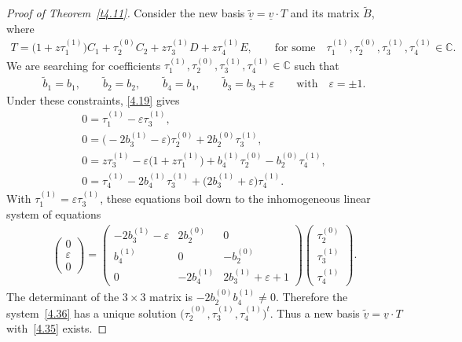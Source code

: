 \documentclass[10pt,a4paper]{amsart}
\numberwithin{equation}{section}
\numberwithin{figure}{section}
\newcommand{\C}{{\mathbb C}}
\newcommand{\www}{\widetilde}
\newcommand{\uuuu}{\underline}
\begin{document}
\begin{proof}[Proof of Theorem~\ref{t4.11}]
Consider the new basis $\uuuu{\www v}=\uuuu{v}\cdot T$
and its matrix $\www B$, where
\begin{gather*}%
T=\big(1+z\tau_1^{(1)}\big)C_1+\tau_2^{(0)}C_2+z\tau_3^{(1)}D
+z\tau_4^{(1)}E,\qquad \text{for some}\quad
\tau_1^{(1)},\tau_2^{(0)},
\tau_3^{(1)},\tau_4^{(1)}\in\C.%
\end{gather*}
We are searching for coefficients
$\tau_1^{(1)},\tau_2^{(0)},\tau_3^{(1)},\tau_4^{(1)}\in\C$
such that
\begin{gather}\label{4.35}
\www b_1=b_1,\qquad
\www b_2=b_2,\qquad
\www b_4=b_4,\qquad
\www b_3=b_3+\varepsilon\qquad \text{with}\quad \varepsilon=\pm 1.
\end{gather}
Under these constraints,
\eqref{4.19} gives
\begin{gather*}
0= \tau_1^{(1)}-\varepsilon \tau_3^{(1)},
\\
0= \big({-}2b_3^{(1)}-\varepsilon\big)\tau_2^{(0)}+ 2b_2^{(0)}\tau_3^{(1)},
\\
0= z\tau_3^{(1)}-\varepsilon\big(1+z\tau_1^{(1)}\big)+b_4^{(1)}\tau_2^{(0)} -b_2^{(0)}\tau_4^{(1)},
\\
0=\tau_4^{(1)} -2b_4^{(1)}\tau_3^{(1)}+\big(2b_3^{(1)}+\varepsilon\big)\tau_4^{(1)}.
\end{gather*}
With $\tau_1^{(1)}=\varepsilon\tau_3^{(1)}$, these
equations boil down to the inhomogeneous linear system
of equations
\begin{gather}\label{4.36}
\begin{pmatrix}0\\ \varepsilon\\ 0 \end{pmatrix} =
\begin{pmatrix} -2b_3^{(1)}-\varepsilon & 2b_2^{(0)} & 0 \\
b_4^{(1)} & 0 & -b_2^{(0)} \\
0 & -2b_4^{(1)} & 2b_3^{(1)}+\varepsilon+1 \end{pmatrix}
\begin{pmatrix} \tau_2^{(0)}\\ \tau_3^{(1)}\\ \tau_4^{(1)}
\end{pmatrix}\!.
\end{gather}
The determinant of the $3\times 3$ matrix is
$-2 b_2^{(0)}b_4^{(1)}\neq 0$. Therefore the system~\eqref{4.36}
has a unique solution $\big(\tau_2^{(0)},\tau_3^{(1)},
\tau_4^{(1)}\big)^t$.
Thus a new basis $\uuuu{\www v}=\uuuu{v}\cdot T$
with~\eqref{4.35} exists.


\end{proof}
\end{document}
